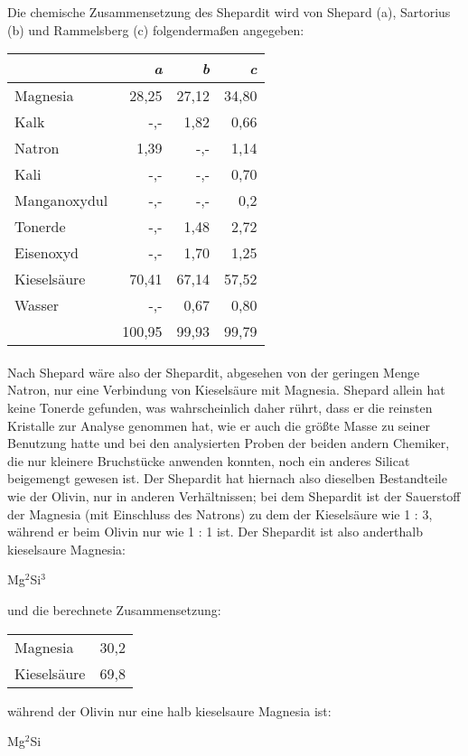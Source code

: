 \documentclass[a4paper, 11pt, oneside]{article}
\begin{document}
Die chemische Zusammensetzung des Shepardit wird von Shepard (a), Sartorius (b) und Rammelsberg (c) folgendermaßen angegeben:
\begin{center}
\begin{tabular}{ |l|r|r|r| }
    \hline
     & \emph{a} & \emph{b} & \emph{c}\\
    \hline\hline
    Magnesia & 28,25 & 27,12 & 34,80\\\hline
    Kalk & -,- & 1,82 & 0,66\\\hline
    Natron & 1,39 & -,- & 1,14\\\hline
    Kali & -,- & -,- & 0,70\\\hline
    Manganoxydul & -,- & -,- & 0,2\\\hline
    Tonerde & -,- & 1,48 & 2,72\\\hline
    Eisenoxyd & -,- & 1,70 & 1,25\\\hline
    Kieselsäure & 70,41 & 67,14 & 57,52\\\hline
    Wasser & -,- & 0,67 & 0,80\\\hline
     & 100,95 & 99,93 & 99,79\\
    \hline
\end{tabular}
\end{center}
\paragraph{}
Nach Shepard wäre also der Shepardit, abgesehen von der geringen Menge Natron, nur eine Verbindung von Kieselsäure mit Magnesia. Shepard allein hat keine Tonerde gefunden, was wahrscheinlich daher rührt, dass er die reinsten Kristalle zur Analyse genommen hat, wie er auch die größte Masse zu seiner Benutzung hatte und bei den analysierten Proben der beiden andern Chemiker, die nur kleinere Bruchstücke anwenden konnten, noch ein anderes Silicat beigemengt gewesen ist. Der Shepardit hat hiernach also dieselben Bestandteile wie der Olivin, nur in anderen Verhältnissen; bei dem Shepardit ist der Sauerstoff der Magnesia (mit Einschluss des Natrons) zu dem der Kieselsäure wie 1 : 3, während er beim Olivin nur wie 1 : 1 ist. Der Shepardit ist also anderthalb kieselsaure Magnesia:
\begin{center}
Mg$^{2}$Si$^{3}$
\end{center}
und die berechnete Zusammensetzung:
\begin{center}
\begin{tabular}{ l r }
    Magnesia & 30,2\\
    Kieselsäure & 69,8\\
\end{tabular}
\end{center}
während der Olivin nur eine halb kieselsaure Magnesia ist:
\begin{center}
Mg$^{2}$Si
\end{center}
\end{document}
